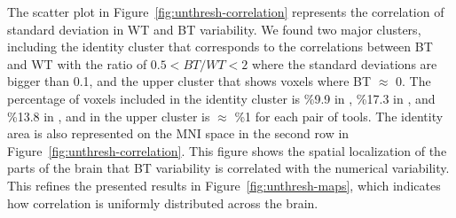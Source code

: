 \documentclass[conference]{IEEEtran}
\begin{document}
\begin{figure}[b]
  \end{figure}


The scatter plot in Figure~\ref{fig:unthresh-correlation} represents the correlation of standard deviation in WT and BT variability.
We found two major clusters, including the identity cluster that corresponds to the correlations
between BT and WT with the ratio of $0.5 < BT/WT < 2$ where the standard deviations are bigger than 0.1,
and the upper cluster that shows voxels where BT $\approx$ 0.
The percentage of voxels included in the identity cluster is \%9.9 in \fslspm, \%17.3 in \fslafni, and \%13.8 in \afnispm,
and in the upper cluster is $\approx$ \%1 for each pair of tools.
The identity area is also represented on the MNI space in the second row in Figure~\ref{fig:unthresh-correlation}.
This figure shows the spatial localization of the parts of the brain that BT variability is correlated with the numerical variability.
This refines the presented results in Figure~\ref{fig:unthresh-maps},
which indicates how correlation is uniformly distributed across the brain.
\end{document}
